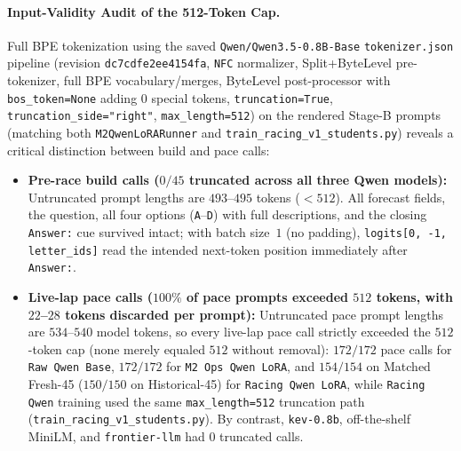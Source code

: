 \documentclass[11pt,a4paper]{article}
\begin{document}
\paragraph{Input-Validity Audit of the 512-Token Cap.}
Full BPE tokenization using the saved \texttt{Qwen/Qwen3.5-0.8B-Base} \texttt{tokenizer.json} pipeline (revision \texttt{dc7cdfe2ee4154fa}, \texttt{NFC} normalizer, Split+ByteLevel pre-tokenizer, full BPE vocabulary/merges, ByteLevel post-processor with \texttt{bos\_token=None} adding $0$ special tokens, \texttt{truncation=True}, \texttt{truncation\_side="right"}, \texttt{max\_length=512}) on the rendered Stage-B prompts (matching both \texttt{M2QwenLoRARunner} and \texttt{train\_racing\_v1\_students.py}) reveals a critical distinction between build and pace calls:
\begin{itemize}[leftmargin=1.5em,itemsep=2pt]
  \item \textbf{Pre-race build calls ($0/45$ truncated across all three Qwen models):} Untruncated prompt lengths are $493$--$495$ tokens ($<512$). All forecast fields, the question, all four options (\texttt{A}--\texttt{D}) with full descriptions, and the closing \texttt{Answer:} cue survived intact; with batch size~$1$ (no padding), \nolinkurl{logits[0, -1, letter_ids]} read the intended next-token position immediately after \texttt{Answer:}.
  \item \textbf{Live-lap pace calls ($100\%$ of pace prompts exceeded $512$ tokens, with $22$--$28$ tokens discarded per prompt):} Untruncated pace prompt lengths are $534$--$540$ model tokens, so every live-lap pace call strictly exceeded the $512$-token cap (none merely equaled $512$ without removal): \textbf{$172/172$} pace calls for \texttt{Raw Qwen Base}, \textbf{$172/172$} for \texttt{M2 Ops Qwen LoRA}, and \textbf{$154/154$} on Matched Fresh-45 (\textbf{$150/150$} on Historical-45) for \texttt{Racing Qwen LoRA}, while \texttt{Racing Qwen} training used the same \texttt{max\_length=512} truncation path (\texttt{train\_racing\_v1\_students.py}). By contrast, \texttt{kev-0.8b}, off-the-shelf MiniLM, and \texttt{frontier-llm} had $0$ truncated calls.

\end{itemize}
\end{document}
